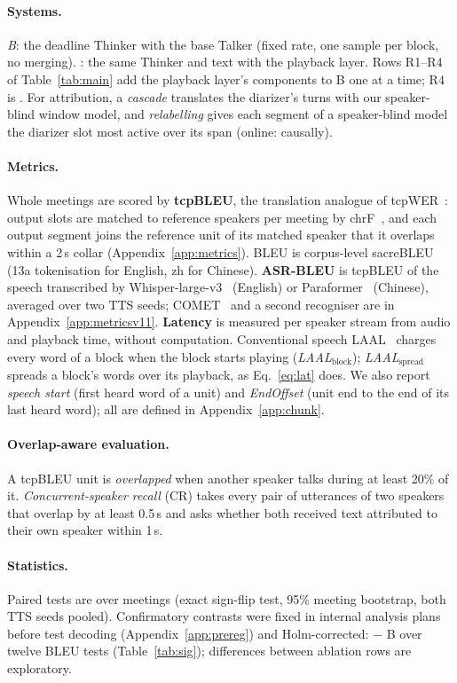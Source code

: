 \paragraph{Systems.} \emph{B}: the deadline Thinker with the base Talker (fixed rate, one sample per block, no
merging). \emph{\sys{}}: the same Thinker and text with the playback layer. Rows R1--R4 of Table~\ref{tab:main}
add the playback layer's components to B one at a time; R4 is \sys{}. For attribution, a \emph{cascade} translates the diarizer's turns with our speaker-blind window model, and
\emph{relabelling} gives each segment of a speaker-blind model the diarizer slot most active over its span (online:
causally).

\paragraph{Metrics.} Whole meetings are scored by \textbf{tcpBLEU}, the translation analogue of
tcpWER~\citep{neumann2023meeteval}: output slots are matched to reference speakers per meeting by
chrF~\citep{popovic2015chrf}, and each output segment joins the reference unit of its matched speaker that it overlaps
within a 2\,s collar (Appendix~\ref{app:metrics}). BLEU is corpus-level sacreBLEU~\citep{post2018call} (13a
tokenisation for English, zh for Chinese). \textbf{ASR-BLEU} is tcpBLEU of the speech transcribed by
Whisper-large-v3~\citep{radford2023robust} (English) or Paraformer~\citep{gao2022paraformer} (Chinese), averaged over
two TTS seeds\ifMetricsV{}; COMET~\citep{rei2022comet} and a second recogniser are in Appendix~\ref{app:metricsv11}\fi.
\textbf{Latency} is measured per speaker stream from audio and playback time, without computation. Conventional speech
LAAL~\citep{papi2022over} charges every word of a block when the block starts playing (\emph{LAAL$_\text{block}$});
\emph{LAAL$_\text{spread}$} spreads a block's words over its playback, as Eq.~\eqref{eq:lat} does. We also report
\emph{speech start} (first heard word of a unit) and \emph{EndOffset} (unit end to the end of its last heard word);
all are defined in Appendix~\ref{app:chunk}.

\paragraph{Overlap-aware evaluation.}
\label{sec:eval-overlap}
A tcpBLEU unit is \emph{overlapped} when another speaker talks during at least 20\% of it. \emph{Concurrent-speaker
recall} (CR) takes every pair of utterances of two speakers that overlap by at least 0.5\,s and asks whether both
received text attributed to their own speaker within 1\,s.

\paragraph{Statistics.} Paired tests are over meetings (exact sign-flip test, 95\% meeting bootstrap, both TTS seeds
pooled). Confirmatory contrasts were fixed in internal analysis plans before test decoding (Appendix~\ref{app:prereg})
and Holm-corrected: \sys{} $-$ B over twelve BLEU tests (Table~\ref{tab:sig}); differences between ablation rows
are exploratory.
